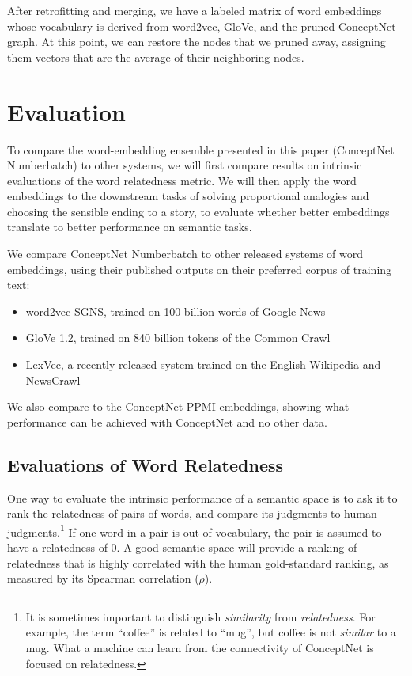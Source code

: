 \documentclass[letterpaper]{article}
\begin{document}
After retrofitting and merging, we have a labeled matrix of word embeddings whose
vocabulary is derived from word2vec, GloVe, and the pruned ConceptNet graph. At
this point, we can restore the nodes that we pruned away, assigning them vectors
that are the average of their neighboring nodes.

\section{Evaluation}

To compare the word-embedding ensemble presented in this paper (ConceptNet
Numberbatch) to other systems, we will first compare results on intrinsic
evaluations of the word relatedness metric. We will then apply the word
embeddings to the downstream tasks of solving proportional analogies and
choosing the sensible ending to a story, to evaluate whether better embeddings
translate to better performance on semantic tasks.

We compare ConceptNet Numberbatch to other released systems of word embeddings,
using their published outputs on their preferred corpus of training text:

\begin{itemize}
    \item word2vec SGNS, trained on 100 billion words of Google News \cite{mikolov2013word2vec}
    \item GloVe 1.2, trained on 840 billion tokens of the Common Crawl \cite{pennington2014glove}
    \item LexVec, a recently-released system trained on the English Wikipedia and NewsCrawl \cite{salle2016lexvec}
\end{itemize}

We also compare to the ConceptNet PPMI embeddings, showing what performance
can be achieved with ConceptNet and no other data.

\subsection{Evaluations of Word Relatedness}
\label{intrinsic-evaluations}

One way to evaluate the intrinsic performance of a semantic space is to ask it
to rank the relatedness of pairs of words, and compare its judgments to human
judgments.\footnote{It is sometimes important to distinguish \emph{similarity}
from \emph{relatedness}. For example, the term ``coffee'' is related to
``mug'', but coffee is not \emph{similar} to a mug. What a machine can learn
from the connectivity of ConceptNet is focused on relatedness.} If one word in
a pair is out-of-vocabulary, the pair is assumed to have a relatedness of 0. A
good semantic space will provide a ranking of relatedness that is highly
correlated with the human gold-standard ranking, as measured by its Spearman
correlation ($\rho$).
\end{document}
